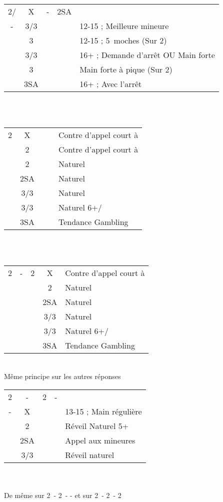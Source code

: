 \documentclass[a4paper, oneside, 11pt]{report}
\begin{document}
		\begin{tabular}{cccc|l}
		2\coeur/\pique & X & - & 2SA &\\
		- & 3\trefle/3\carreau &&& 12-15 ; Meilleure mineure\\
		& 3\coeur &&& 12-15 ; 5\coeur\ moches (Sur 2\pique)\\
		& 3\coeur/3\pique &&& 16+ ; Demande d'arrêt OU Main forte\\
		& 3\pique &&& Main forte à pique (Sur 2\coeur)\\
		& 3SA &&& 16+ ; Avec l'arrêt\\
		\end{tabular}\\\\

		\begin{tabular}{cccc|l}
		2\carreau & X &&& Contre d'appel court à \pique\\
		& 2\coeur &&& Contre d'appel court à \coeur\\
		& 2\pique &&& Naturel\\
		& 2SA &&& Naturel\\
		& 3\trefle/3\carreau &&& Naturel\\
		& 3\coeur/3\pique &&& Naturel 6+\coeur/\pique\\
		& 3SA &&& Tendance Gambling\\
		\end{tabular}\\\\
		
		\begin{tabular}{cccc|l}
		2\carreau & -  & 2\coeur & X & Contre d'appel court à \coeur\\
		&&& 2\pique & Naturel\\
		&&& 2SA & Naturel\\
		&&& 3\trefle/3\carreau & Naturel\\
		&&& 3\coeur/3\pique & Naturel 6+\coeur/\pique\\
		&&& 3SA & Tendance Gambling\\
		\end{tabular}\\
		Même principe sur les autres réponses\\
		
		\begin{tabular}{cccc|l}
		2\carreau & -  & 2\coeur & - &\\
		- & X &&& 13-15 ; Main régulière\\
		& 2\pique &&& Réveil Naturel 5+\pique\\
		& 2SA &&& Appel aux mineures\\
		& 3\trefle/3\carreau &&& Réveil naturel\\
		\end{tabular}\\\\
		De même sur 2\carreau\ - 2\pique\ - - et sur 2\carreau\ - 2\coeur\ - 2\pique\\
		
\end{document}
